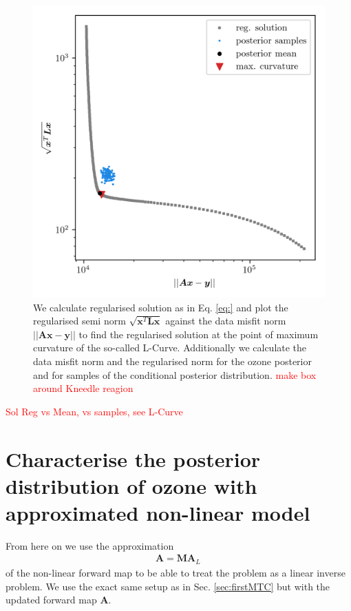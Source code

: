\begin{figure}[ht!]
	\centering
	\includegraphics{LCurvePhD.png}
	\caption[Plot of the L-curve to find the regularised solution.]{We calculate regularised solution as in Eq. \ref{eq:} and plot the regularised semi norm $\sqrt{\bm{x}^T\bm{Lx}}$ against the data misfit norm $||\bm{Ax} -\bm{y} ||$ to find the regularised solution at the point of maximum curvature of the so-called L-Curve. Additionally we calculate the data misfit norm and the regularised norm for the ozone posterior and for samples of the conditional posterior distribution. \textcolor{red}{make box around Kneedle reagion}}
	\label{fig:LCurve}
\end{figure}

\textcolor{red}{Sol Reg vs Mean, vs samples, see L-Curve}



\section{Characterise the posterior distribution of ozone with approximated non-linear model}

From here on we use the approximation
\begin{align}
	 \bm{A} =  \bm{M A}_L \, 
\end{align}
of the non-linear forward map to be able to treat the problem as a linear inverse problem.
We use the exact same setup as in Sec. \ref{sec:firstMTC} but with the updated forward map $\bm{A}$.


